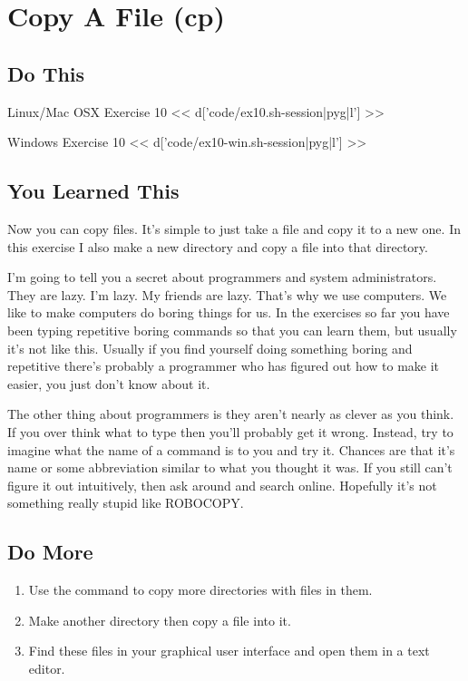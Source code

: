 \chapter{Copy A File (cp)}

\section{Do This}

\begin{code}{Linux/Mac OSX Exercise 10}
<< d['code/ex10.sh-session|pyg|l'] >>
\end{code}

\begin{code}{Windows Exercise 10}
<< d['code/ex10-win.sh-session|pyg|l'] >>
\end{code}

\section{You Learned This}

Now you can copy files.  It's simple to just take a file and copy it to a new
one.  In this exercise I also make a new directory and copy a file into that
directory.

I'm going to tell you a secret about programmers and system administrators.
They are lazy.  I'm lazy.  My friends are lazy.  That's why we use computers.
We like to make computers do boring things for us.  In the exercises so far
you have been typing repetitive boring commands so that you can learn them,
but usually it's not like this.  Usually if you find yourself doing something
boring and repetitive there's probably a programmer who has figured out
how to make it easier, you just don't know about it.

The other thing about programmers is they aren't nearly as clever as you think.
If you over think what to type then you'll probably get it wrong.  Instead, try
to imagine what the name of a command is to you and try it.  Chances are that
it's name or some abbreviation similar to what you thought it was.  If you still can't figure it out intuitively,
then ask around and search online. Hopefully it's not something really stupid like ROBOCOPY.


\section{Do More}

\begin{enumerate}
\item Use the  command to copy more directories with files in them.
\item Make another directory then copy a file into it.
\item Find these files in your graphical user interface and open them
    in a text editor.
\end{enumerate}

